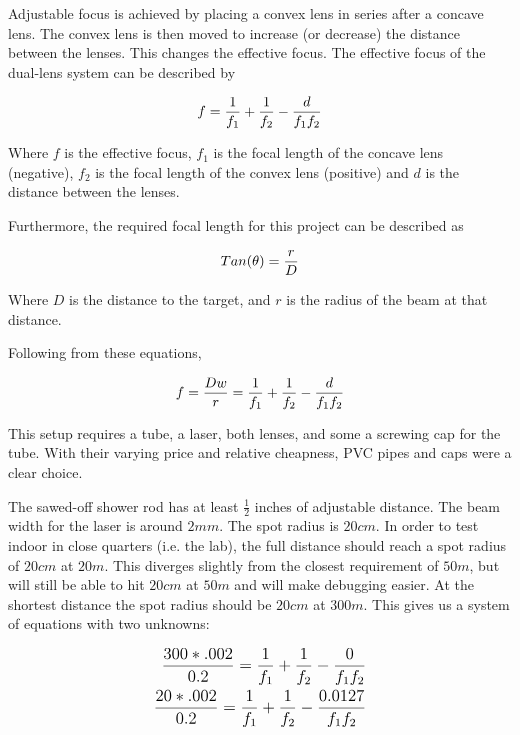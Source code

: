 \documentclass[letterpaper,10pt]{article}
\begin{document}
\begin{spacing}{1.15}
Adjustable focus is achieved by placing a convex lens in series after a concave lens. The convex lens is then moved to increase (or decrease) the distance between the lenses. This changes the effective focus. The effective focus of the dual-lens system can be described by 

\begin{equation}
	\large
	f = \frac{1}{f_1} + \frac{1}{f_2} - \frac{d}{f_1 f_2}
\end{equation}

Where $f$ is the effective focus, $f_1$ is the focal length of the concave lens (negative), $f_2$ is the focal length of the convex lens (positive) and $d$ is the distance between the lenses. 

Furthermore, the required focal length for this project can be described as 

\begin{equation} \large
	Tan(\theta) = \frac{r}{D}
\end{equation}

Where $D$ is the distance to the target, and $r$ is the radius of the beam at that distance. 

Following from these equations, 

\begin{equation} \large
	f = \frac{Dw}{r} =  \frac{1}{f_1} + \frac{1}{f_2} - \frac{d}{f_1 f_2}
\end{equation}

This setup requires a tube, a laser, both lenses, and some a screwing cap for the tube. With their varying price and relative cheapness, PVC pipes and caps were a clear choice. 

The sawed-off shower rod has at least $\frac{1}{2}$ inches of adjustable distance. The beam width for the laser is around $2mm$. The spot radius is $20cm$. In order to test indoor in close quarters (i.e. the lab), the full distance should reach a spot radius of $20cm$ at $20 m$. This diverges slightly from the closest requirement of $50m$, but will still be able to hit $20cm$ at $50m$ and will make debugging easier. At the shortest distance the spot radius should be $20cm$ at $300m$. This gives us a system of equations with two unknowns: 

 \begin{align} \label{eq:1} \large \begin{split}
\frac{300*.002}{0.2} =  \frac{1}{f_1} + \frac{1}{f_2} - \frac{0}{f_1 f_2}
 \\
 \frac{20*.002}{0.2} =  \frac{1}{f_1} + \frac{1}{f_2} - \frac{0.0127}{f_1 f_2}
 \end{split}
 \end{align}


\end{spacing}
\end{document}
